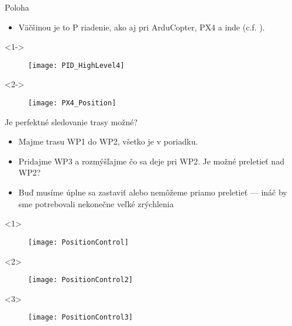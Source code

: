  \begin{frame}[t]{Poloha}
\begin{itemize}
  \item<1-> Väčšinou je to P riadenie, ako aj pri ArduCopter, PX4 a inde (c.f. \cite{Saha2020}).
\end{itemize}

  \begin{onlyenv}<1->
  \begin{figure}
\centering
  \texttt{[image: PID\_HighLevel4]}\\
\end{figure}
\end{onlyenv}


  \begin{onlyenv}<2->
  \begin{figure}
\centering
  \texttt{[image: PX4\_Position]}\\
\end{figure}
\end{onlyenv}
  \end{frame}




\begin{frame}{Je perfektné sledovanie trasy možné?}
\begin{itemize}
\item<1-> Majme trasu WP1 do WP2, všetko je v poriadku.
\item<2-> Pridajme WP3 a rozmýšľajme čo sa deje pri WP2. Je možné preletieť nad WP2?
\item<3-> Buď musíme úplne sa zastaviť alebo nemôžeme priamo preletieť --- ináč by sme potrebovali nekonečne veľké zrýchlenia
\end{itemize}

\begin{onlyenv}<1>
  \begin{figure}
\centering
  \texttt{[image: PositionControl]}\\
\end{figure}
\end{onlyenv}

\begin{onlyenv}<2>
  \begin{figure}
\centering
  \texttt{[image: PositionControl2]}\\
\end{figure}
\end{onlyenv}

\begin{onlyenv}<3>
  \begin{figure}
\centering
  \texttt{[image: PositionControl3]}\\
\end{figure}
\end{onlyenv}
\end{frame}
